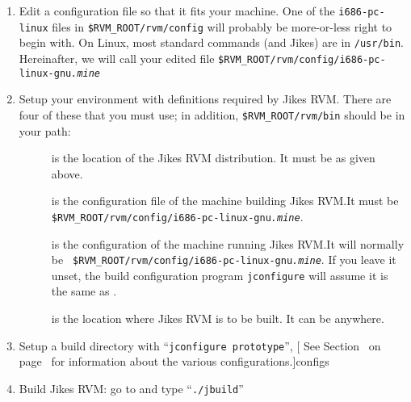 \begin{enumerate}
\item Edit a configuration file so that it fits your machine.  One of
the {\tt i686-pc-linux} files in {\tt \$RVM\_\-ROOT/rvm/config} will probably be
more-or-less right to begin with.  On Linux, most standard commands
(and Jikes) are in {\tt /usr/bin}.  Hereinafter, we will call your edited
file {\tt \$RVM\_\-ROOT/rvm/config/i686-pc-linux-gnu{\it .mine}}

%
\item Setup your environment with definitions required by Jikes RVM.\@
There are four of these that you must use; in addition,
{\tt \$RVM\_\-ROOT/rvm/bin} should be in your path:

\begin{description}

\item[] is the location of the Jikes RVM distribution.  It
must be  as given above.

\item[] is the configuration file of the machine
building Jikes RVM.\@  It must be
{\tt \$RVM\_\-ROOT/rvm/config/i686-pc-linux-gnu{\it .mine}}.

\item[] is the configuration of the
  machine running Jikes RVM.\@  It will normally be {\tt
  \$RVM\_\-ROOT/rvm/config/i686-pc-linux-gnu{\it .mine}}.  If you
  leave it unset, the build configuration program {\tt jconfigure}
  will assume it is the same as .

\item[] is the location where Jikes RVM is to be built.  It
can be anywhere.

\end{description}

\item Setup a build directory with ``{\tt jconfigure prototype}'', [  See Section~\Ref{} on page~\Pageref{}
for information about the various configurations.]{configs}

\item Build Jikes RVM: go to  and type ``{\tt ./jbuild}''

\end{enumerate}

\newcommand{\gccURL}{ftp://ftp.gnu.org/gnu/gcc}
\newcommand{\glibcURL}{ftp://ftp.gnu.org/gnu/glibc}
\newcommand{\makeURL}{ftp://ftp.gnu.org/gnu/make}
\newcommand{\bashURL}{ftp://ftp.gnu.org/gnu/bash}
\newcommand{\bisonURL}{ftp://ftp.gnu.org/gnu/bison}
\newcommand{\tarURL}{ftp://ftp.gnu.org/gnu/tar}
\newcommand{\autoconfURL}{ftp://ftp.gnu.org/gnu/autoconf}
\newcommand{\automakeURL}{ftp://ftp.gnu.org/gnu/automake}
\newcommand{\wgetURL}{ftp://ftp.gnu.org/gnu/wget}
\newcommand{\cvsURL}{http://www.cvshome.org}
\newcommand{\linuxPPCJDKURL}{http://www.ibm.com/java/jdk/linux/index.html}
\newcommand{\linuxKernelURL}{http://www.kernel.org}

